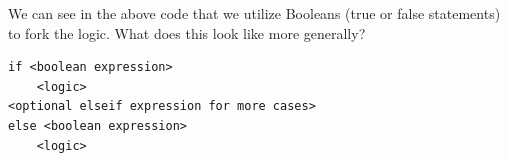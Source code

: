 \documentclass[12pt]{article}
\begin{document}
		We can see in the above code that we utilize Booleans (true or false statements) to fork the logic.
		What does this look like more generally?

		\begin{lstlisting}[style=pseudocode]
if <boolean expression>
	<logic>
<optional elseif expression for more cases>
else <boolean expression>
	<logic>
		\end{lstlisting}


	\nocite{*}

	\newpage %
	\backmatter
	\printbibliography

	\newpage %
	\printindex

	\newpage %
	\appendix
\end{document}
